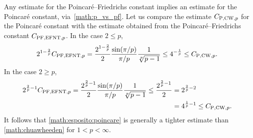 \documentclass[10pt,a4paper]{article}
\begin{document}
\begin{remark}
    Any estimate for the Poincar\'e--Friedrichs constant implies an estimate for the Poincar\'e constant, via~\eqref{math:p_vs_pf}. 
    Let us compare the estimate $C_{{\rm P},{\rm CW},p}$ for the Poincar\'e constant
    with the estimate obtained from the Poincar\'e--Friedrichs constant $C_{{\rm PF},{\rm EFNT},p}$. 
    In the case $2 \leq p$, 
    \begin{align*}
        2^{1-\frac 2 p}
        C_{{\rm PF},{\rm EFNT},p}
        =
        \frac{ 2^{1-\frac 2 p} }{2}
        \frac{ \sin(\pi/p) }{ \pi/p }
        \frac{ 1 }{ \sqrt[p]{p-1} }
        \leq 
        4^{-\frac 1 p}
        \leq
        C_{{\rm P},{\rm CW},p} 
        .
    \end{align*}
    In the case $2 \geq p$, 
    \begin{align*}
        2^{\frac 2 p - 1}
        C_{{\rm PF},{\rm EFNT},p}
        =
        \frac{ 2^{\frac 2 p - 1} }{2}
        \frac{ \sin(\pi/p) }{ \pi/p }
        \frac{ 1 }{ \sqrt[p]{p-1} }
        \leq
        \frac{ 2^{\frac 2 p-1} }{2}
        &
        =
        2^{\frac 2 p - 2}
        \\&
        =
        4^{\frac 1 p - 1}
        \leq
        C_{{\rm P},{\rm CW},p} 
        .
    \end{align*}
    It follows that \eqref{math:esposito:poincare} is generally a tighter estimate than \eqref{math:chuawheeden} for $1 < p < \infty$.

\end{remark}
\end{document}
